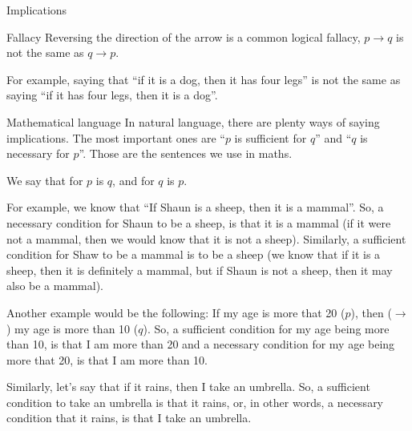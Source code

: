 \documentclass{article}
\begin{document}
\begin{parag}{Implications}
    \begin{subparag}{Fallacy}
        Reversing the direction of the arrow is a common logical fallacy, $p \to q$ is not the same as $q \to p$.

        For example, saying that ``if it is a dog, then it has four legs'' is not the same as saying ``if it has four legs, then it is a dog''.
    \end{subparag}

    \begin{subparag}{Mathematical language}
        In natural language, there are plenty ways of saying implications. The most important ones are ``$p$ is sufficient for $q$'' and ``$q$ is necessary for $p$''. Those are the sentences we use in maths.

        We say that  for $p$ is $q$, and  for $q$ is $p$.

        For example, we know that ``If Shaun is a sheep, then it is a mammal''. So, a necessary condition for Shaun to be a sheep, is that it is a mammal (if it were not a mammal, then we would know that it is not a sheep). Similarly, a sufficient condition for Shaw to be a mammal is to be a sheep (we know that if it is a sheep, then it is definitely a mammal, but if Shaun is not a sheep, then it may also be a mammal).

        Another example would be the following: If my age is more that 20 ($p$), then ($\to$) my age is more than 10 ($q$). So, a sufficient condition for my age being more than 10, is that I am more than 20 and a necessary condition for my age being more that 20, is that I am more than 10.

        Similarly, let's say that if it rains, then I take an umbrella. So, a sufficient condition to take an umbrella is that it rains, or, in other words, a necessary condition that it rains, is that I take an umbrella.
    \end{subparag}
\end{parag}
\end{document}

